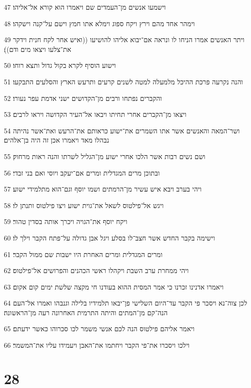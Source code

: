 \par 47 וישמעו אנשים מן־העמדים שם ויאמרו הוא קורא אל־אליהו׃
\par 48 וימהר אחד מהם וירץ ויקח ספוג וימלא אתו חמץ וישם על־קנה וישקהו׃
\par 49 ויתר האנשים אמרו הניחו לו ונראה אם־יבוא אליהו להושיעו ((ואיש אחר לקח חנית וידקר את־צלעו ויצאו מים ודם))׃
\par 50 וישוע הוסיף לקרא בקול גדול ותצא רוחו׃
\par 51 והנה נקרעה פרכת ההיכל מלמעלה למטה לשנים קרעים ותרעש הארץ והסלעים התבקעו׃
\par 52 והקברים נפתחו ורבים מן־הקדושים ישני אדמת עפר נעורו׃
\par 53 ויצאו מן־הקברים אחרי תחיתו ויבאו אל־העיר הקדושה ויראו לרבים׃
\par 54 ושר־המאה והאנשים אשר אתו השמרים את־ישוע כראותם את־הרעש ואת־אשר נהיתה נבהלו מאד ויאמרו אכן זה היה בן־אלהים׃
\par 55 ושם נשים רבות אשר הלכו אחרי ישוע מן־הגליל לשרתו והנה ראות מרחוק׃
\par 56 ובתוכן מרים המגדלית ומרים אם־יעקב ויוסי ואם בני זבדי׃
\par 57 ויהי בערב ויבא איש עשיר מן־הרמתים ושמו יוסף וגם־הוא מתלמידי ישוע׃
\par 58 ויגש אל־פילטוס לשאל את־גוית ישוע ויצו פילטוס ותנתן לו׃
\par 59 ויקח יוסף את־הגויה ויכרך אותה בסדין טהור׃
\par 60 וישימה בקבר החדש אשר חצב־לו בסלע ויגל אבן גדולה על־פתח הקבר וילך לו׃
\par 61 ומרים המגדלית ומרים האחרת היו ישבות שם ממול הקבר׃
\par 62 ויהי ממחרת ערב השבת ויקהלו ראשי הכהנים והפרושים אל־פילטוס׃
\par 63 ויאמרו אדנינו זכרנו כי אמר המסית ההוא בעודנו חי מקצה שלשת ימים קום אקום׃
\par 64 לכן צוה־נא ויסכר פי הקבר עד־היום השלישי פן־יבאו תלמידיו בלילה וגנבהו ואמרו אל־העם הנה־קם מן־המתים והיתה התרמית האחרונה רעה מן־הראשונה׃
\par 65 ויאמר אליהם פילטוס הנה לכם אנשי משמר לכו סכרוהו כאשר ידעתם׃
\par 66 וילכו ויסכרו את־פי הקבר ויחתמו את־האבן ויעמידו עליו את־המשמר׃

\chapter{28}

